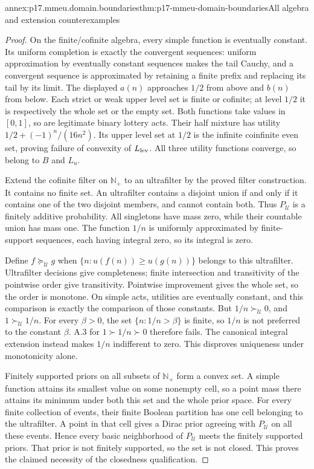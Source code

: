 \begin{annexitem}{annex:p17.mmeu.domain.boundaries}{thm:p17-mmeu-domain-boundaries}{All algebra and extension counterexamples}
\begin{proof}
On the finite/cofinite algebra,
every simple function is eventually
constant. Its uniform completion
is exactly the convergent sequences:
uniform approximation by eventually
constant sequences makes the tail
Cauchy, and a convergent sequence
is approximated by retaining a
finite prefix and replacing its
tail by its limit.
The displayed \(a(n)\) approaches
\(1/2\) from above and \(b(n)\)
from below. Each strict or weak
upper level set is finite or
cofinite; at level \(1/2\) it
is respectively the whole set
or the empty set. Both functions
take values in \([0,1]\), so
are legitimate binary lottery acts.
Their half mixture has utility
\(1/2+(-1)^n/(16n^2)\).
Its upper level set at \(1/2\)
is the infinite coinfinite even
set, proving failure of convexity
of \(L_{\rm lev}\). All three
utility functions converge,
so belong to \(B\) and \(L_u\).

Extend the cofinite filter on
\(\mathbb N_+\) to an ultrafilter
by the proved filter construction.
It contains no finite set.
An ultrafilter contains a disjoint
union if and only if it contains
one of the two disjoint members,
and cannot contain both.
Thus \(P_{\mathcal U}\) is a
finitely additive probability.
All singletons have mass zero,
while their countable union has
mass one. The function \(1/n\)
is uniformly approximated by
finite-support sequences, each
having integral zero, so its
integral is zero.

Define \(f\succeq_{\mathcal U}g\)
when \(\{n:u(f(n))\geq u(g(n))\}\)
belongs to this ultrafilter.
Ultrafilter decisions give completeness;
finite intersection and transitivity
of the pointwise order give
transitivity. Pointwise improvement
gives the whole set, so the order
is monotone. On simple acts,
utilities are eventually constant,
and this comparison is exactly
the comparison of those constants.
But \(1/n\succ_{\mathcal U}0\),
and \(1\succ_{\mathcal U}1/n\).
For every \(\beta>0\), the set
\(\{n:1/n>\beta\}\) is finite,
so \(1/n\) is not preferred
to the constant \(\beta\).
A.3 for \(1\succ1/n\succ0\)
therefore fails. The canonical
integral extension instead makes
\(1/n\) indifferent to zero.
This disproves uniqueness under
monotonicity alone.

Finitely supported priors on
all subsets of \(\mathbb N_+\)
form a convex set. A simple
function attains its smallest
value on some nonempty cell,
so a point mass there attains
its minimum under both this
set and the whole prior space.
For every finite collection
of events, their finite Boolean
partition has one cell belonging
to the ultrafilter. A point in
that cell gives a Dirac prior
agreeing with \(P_{\mathcal U}\)
on all these events. Hence
every basic neighborhood of
\(P_{\mathcal U}\) meets the
finitely supported priors.
That prior is not finitely
supported, so the set is
not closed. This proves the
claimed necessity of the
closedness qualification.
\end{proof}
\end{annexitem}

